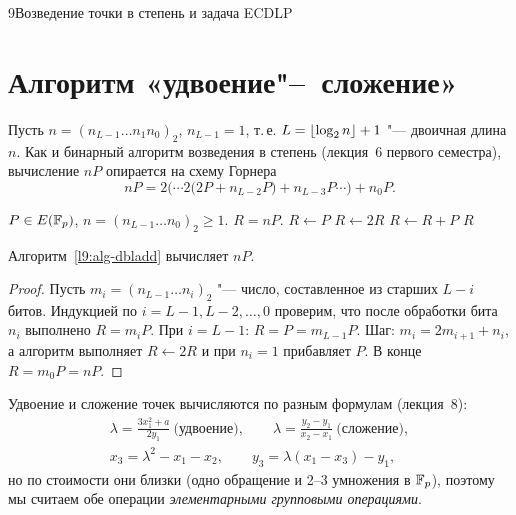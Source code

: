 \begin{lecture}{9}{Возведение точки в степень и задача ECDLP}
\section{Алгоритм «удвоение"--~сложение»}\label{l9:dbladd}

Пусть $n = (n_{L-1} \dots n_1 n_0)_2$, $n_{L-1} = 1$, т.\,е. $L = \lfloor\log_2 n\rfloor + 1$ "---
двоичная длина $n$. Как и бинарный алгоритм возведения в степень (лекция~6 первого семестра),
вычисление $nP$ опирается на схему Горнера
\[
  nP = 2\bigl(\cdots 2\bigl(2P + n_{L-2}P\bigr) + n_{L-3}P \cdots\bigr) + n_0 P.
\]

\begin{algorithm}\label{l9:alg-dbladd}\leavevmode
\begin{algorithmic}[1]
\Require $P \in E(\mathbb{F}_p)$, $n = (n_{L-1} \dots n_0)_2 \ge 1$.
\Ensure $R = nP$.
\State $R \gets P$
  \State $R \gets 2R$ 
   \State $R \gets R + P$  \EndIf
\EndFor
\State \Return $R$
\end{algorithmic}
\end{algorithm}

\begin{proposition}\label{l9:dbladd-correct}
Алгоритм~\ref{l9:alg-dbladd} вычисляет $nP$.
\end{proposition}

\begin{proof}
Пусть $m_i = (n_{L-1} \dots n_i)_2$ "--- число, составленное из старших $L - i$ битов. Индукцией
по $i = L - 1, L - 2, \dots, 0$ проверим, что после обработки бита $n_i$ выполнено
$R = m_i P$. При $i = L - 1$: $R = P = m_{L-1} P$. Шаг: $m_i = 2m_{i+1} + n_i$, а алгоритм
выполняет $R \gets 2R$ и при $n_i = 1$ прибавляет $P$. В конце $R = m_0 P = nP$.
\end{proof}

Удвоение и сложение точек вычисляются по разным формулам (лекция~8):
\[
\begin{gathered}
  \lambda = \frac{3x_1^2 + a}{2y_1}\ \text{(удвоение)}, \qquad
  \lambda = \frac{y_2 - y_1}{x_2 - x_1}\ \text{(сложение)},\\
  x_3 = \lambda^2 - x_1 - x_2, \qquad y_3 = \lambda(x_1 - x_3) - y_1,
\end{gathered}
\]
но по стоимости они близки (одно обращение и 2--3 умножения в $\mathbb{F}_p$), поэтому мы считаем
обе операции \emph{элементарными групповыми операциями}.


\end{lecture}
